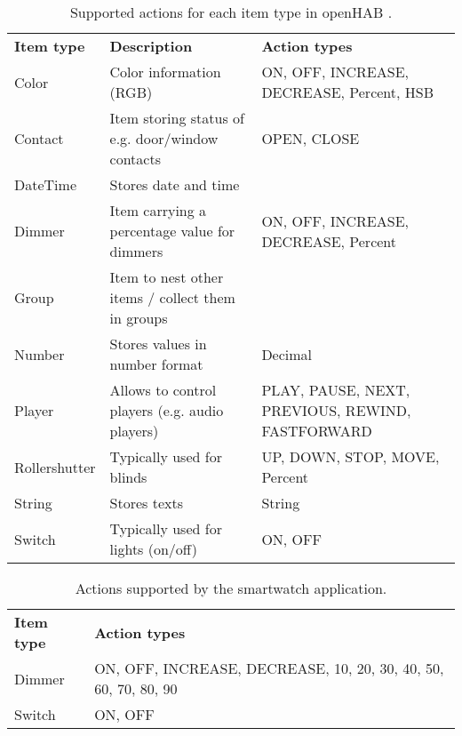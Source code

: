 \begin{table}[]
\centering
\caption{Supported actions for each item type in openHAB \cite{eclipse:smarthomeitems}.}
\label{tbl:design:communication-with-openhab:types}
\begin{tabular}{p{2cm}p{6cm}p{6cm}}
\textbf{Item type} & \textbf{Description}                              & \textbf{Action types}                      \\ 
Color              & Color information (RGB)                           & ON, OFF, INCREASE, DECREASE, Percent, HSB      \\
Contact            & Item storing status of e.g. door/window contacts  & OPEN, CLOSE                                  \\
DateTime           & Stores date and time                              &                                            \\
Dimmer             & Item carrying a percentage value for dimmers      & ON, OFF, INCREASE, DECREASE, Percent           \\
Group              & Item to nest other items / collect them in groups &                                            \\
Number             & Stores values in number format                    & Decimal                                    \\
Player             & Allows to control players (e.g. audio players)    & PLAY, PAUSE, NEXT, PREVIOUS, REWIND, FASTFORWARD \\
Rollershutter      & Typically used for blinds                         & UP, DOWN, STOP, MOVE, Percent                  \\
String             & Stores texts                                      & String                                     \\
Switch             & Typically used for lights (on/off)                & ON, OFF                                     
\end{tabular}
\end{table}

\begin{table}[]
\centering
\caption{Actions supported by the smartwatch application.}
\label{tbl:design:communication-with-openhab:supported-types}
\begin{tabular}{p{2cm}p{11cm}}
\textbf{Item type}      & \textbf{Action types}                      \\ 
Dimmer                  & ON, OFF, INCREASE, DECREASE, 10, 20, 30, 40, 50, 60, 70, 80, 90           \\
Switch                  & ON, OFF                                     
\end{tabular}
\end{table}

